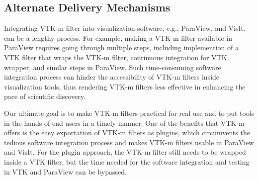 \subsection{Alternate Delivery Mechanisms}

Integrating VTK-m filter into visualization software, e.g., ParaView, and VisIt, can be a lengthy process. For example, making a VTK-m filter available in ParaView requires going through multiple steps, including implemention of a VTK filter that wraps the VTK-m filter, continuous integration for VTK wrapper, and similar steps in ParaView. Such time-consuming software integration process can hinder the accessibility of VTK-m filters inside visualization tools, thus rendering VTK-m filters less effective in enhancing the pace of scientific discovery. 

Our ultimate goal is to make VTK-m filters practical for real use and to put tools in the hands of end users in a timely manner. One of the benefits that VTK-m offers is the easy exportation of VTK-m filters as plugins, which circumvents the tedious software integration process and makes VTK-m filters usable in ParaView and VisIt. For the plugin approach, the VTK-m filter still needs to be wrapped inside a VTK filter, but the time needed for the software integration and testing in VTK and ParaView can be bypassed.       

